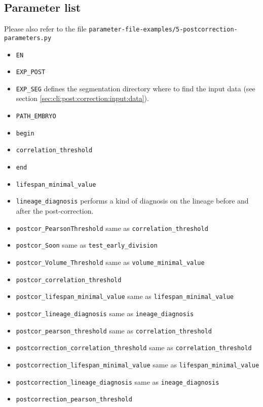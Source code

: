 \subsection{Parameter list}

Please also refer to the file
\texttt{parameter-file-examples/5-postcorrection-parameters.py}

\begin{itemize}
\itemsep -0.5ex
\item \texttt{EN}
\item \texttt{EXP\_POST}
\item \texttt{EXP\_SEG}
      defines the segmentation directory where to find the input data (see section \ref{sec:cli:post:correction:input:data}).
\item \texttt{PATH\_EMBRYO}
\item \texttt{begin}
\item \texttt{correlation\_threshold}
\item \texttt{end}
\item \texttt{lifespan\_minimal\_value}
\item \texttt{lineage\_diagnosis}
      performs a kind of diagnosis on the lineage before and after the post-correction.
\item \texttt{postcor\_PearsonThreshold} 
      same as \texttt{correlation\_threshold}
\item \texttt{postcor\_Soon}
      same as \texttt{test\_early\_division}
\item \texttt{postcor\_Volume\_Threshold} 
      same as \texttt{volume\_minimal\_value}
\item \texttt{postcor\_correlation\_threshold}
\item \texttt{postcor\_lifespan\_minimal\_value}
      same as \texttt{lifespan\_minimal\_value}
\item \texttt{postcor\_lineage\_diagnosis}
      same as \texttt{ineage\_diagnosis}
\item \texttt{postcor\_pearson\_threshold} 
      same as \texttt{correlation\_threshold}
\item \texttt{postcorrection\_correlation\_threshold}
       same as \texttt{correlation\_threshold}
\item \texttt{postcorrection\_lifespan\_minimal\_value}
      same as \texttt{lifespan\_minimal\_value}
\item \texttt{postcorrection\_lineage\_diagnosis}
      same as \texttt{ineage\_diagnosis}
\item \texttt{postcorrection\_pearson\_threshold}

\end{itemize}
